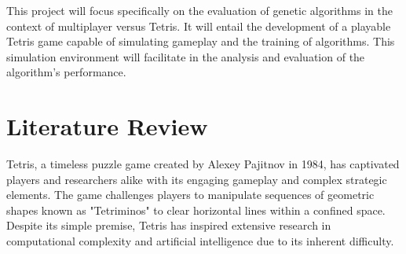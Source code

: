 \documentclass[a4paper, 12pt]{extreport}
\begin{document}
	
	This project will focus specifically on the evaluation of genetic algorithms in the context of multiplayer versus Tetris. It will entail the development of a playable Tetris game capable of simulating gameplay and the training of algorithms. This simulation environment will facilitate in the analysis and evaluation of the algorithm's performance.	
	
	
	
	\chapter{Literature Review}
	
	
	
	Tetris, a timeless puzzle game created by Alexey Pajitnov in 1984, has captivated players and researchers alike with its engaging gameplay and complex strategic elements. The game challenges players to manipulate sequences of geometric shapes known as "Tetriminos" to clear horizontal lines within a confined space. Despite its simple premise, Tetris has inspired extensive research in computational complexity and artificial intelligence due to its inherent difficulty.
	
\end{document}
